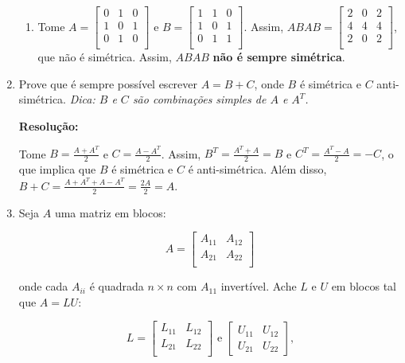 \documentclass[leqno]{article}
\begin{document}
\begin{enumerate}
\begin{enumerate}
        
        \item Tome $A=\begin{bmatrix}
        0 & 1 & 0\\
        1 & 0 & 1\\
        0 & 1 & 0\\
        \end{bmatrix}$ e $B=\begin{bmatrix}
        1 & 1 & 0\\
        1 & 0 & 1\\
        0 & 1 & 1\\
        \end{bmatrix}$. Assim, $ABAB=\begin{bmatrix}
        2 & 0 & 2\\
        4 & 4 & 4\\
        2 & 0 & 2\\
        \end{bmatrix}$, que não é simétrica. Assim, $ABAB$ \textbf{não é sempre simétrica}.
    \end{enumerate}
    
    
    
    \item Prove que é sempre possível escrever $A=B+C$, onde $B$ é simétrica e $C$ anti-simétrica. \textit{Dica: $B$ e $C$ são combinações simples de $A$ e $A^T$.}
    
    \textbf{Resolução:}
    
    Tome $B=\frac{A+A^T}{2}$ e $C=\frac{A-A^T}{2}$. Assim, $B^T=\frac{A^T+A}{2}=B$ e $C^T=\frac{A^T-A}{2}=-C$, o que implica que $B$ é simétrica e $C$ é anti-simétrica. Além disso, $B+C=\frac{A+A^T+A-A^T}{2}=\frac{2A}{2}=A$.
    
    \item Seja $A$ uma matriz em blocos:
    
    $$A=\begin{bmatrix}
    A_{11} & A_{12}\\
    A_{21} & A_{22}\\
    \end{bmatrix}$$
    
    onde cada $A_{ii}$ é quadrada $n\times n$ com $A_{11}$ invertível. Ache $L$ e $U$ em blocos tal que $A=LU$:
    
    $$L=\begin{bmatrix}
    L_{11} & L_{12}\\
    L_{21} & L_{22}\\
    \end{bmatrix}\text{ e }\begin{bmatrix}
    U_{11} & U_{12}\\
    U_{21} & U_{22}
    \end{bmatrix}\text{,}$$
    

\end{enumerate}
\end{document}
